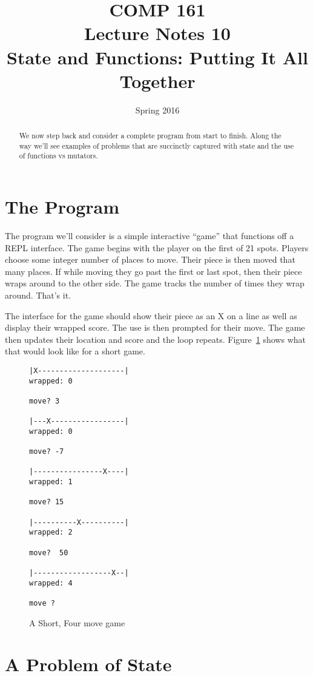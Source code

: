 \documentclass[nobib]{tufte-handout}
\title{COMP 161 \\ Lecture Notes 10 \\ State and Functions: Putting It All Together}
\date{Spring 2016}
\begin{document}
\maketitle

\begin{abstract}
We now step back and consider a complete program from start to finish. Along the way we'll see examples of problems that are succinctly captured with state and the use of functions vs mutators.
\end{abstract}

\section{The Program}

The program we'll consider is a simple interactive ``game'' that functions off a REPL interface. The game begins with the player on the first of 21 spots. Players choose some integer number of places to move. Their piece is then moved that many places. If while moving they go past the first or last spot, then their piece wraps around to the other side. The game tracks the number of times they wrap around. That's it.

The interface for the game should show their piece as an X on a line as well as display their wrapped score. The use is then prompted for their move. The game then updates their location and score and the loop repeats. Figure~\ref{fig:example} shows what that would look like for a short game.

\begin{figure}[!htbp]
\begin{verbatim}
|X--------------------|
wrapped: 0

move? 3

|---X-----------------|
wrapped: 0

move? -7

|----------------X----|
wrapped: 1

move? 15

|----------X----------|
wrapped: 2

move?  50

|------------------X--|
wrapped: 4

move ?
\end{verbatim}
\label{fig:example}
\caption{A Short, Four move game}
\end{figure}

\section{A Problem of State}
\end{document}
